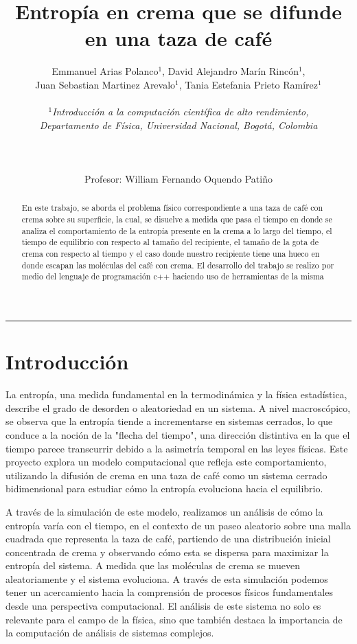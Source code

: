 \documentclass{article}
\title{Entropía en crema que se difunde en una taza de café}
\author{
 {\large Emmanuel Arias Polanco$^1$, David Alejandro Marín Rincón$^1$,} \\
 {\large Juan Sebastian Martinez Arevalo$^1$, Tania Estefania Prieto Ramírez$^1$} \\ \\
 \textit{$^1$Introducción a la computación científica de alto rendimiento,} \\ 
 \textit{Departamento de Física, Universidad Nacional, Bogotá, Colombia} \\ \\
\Today\\ \\
 Profesor: William Fernando Oquendo Patiño\\
}
\begin{document}
\vspace{-5mm}
\maketitle
\begin{abstract}
    En este trabajo, se aborda el problema físico correspondiente a una taza de café con crema sobre su superficie, la cual, se disuelve a medida que pasa el tiempo en donde se analiza el comportamiento de la entropía presente en la crema a lo largo del tiempo, el tiempo de equilibrio con respecto al tamaño del recipiente, el tamaño de la gota de crema con respecto al tiempo y el caso donde nuestro recipiente tiene una hueco en donde escapan las moléculas del café con crema. El desarrollo del trabajo se realizo por medio del lenguaje de programación c++ haciendo uso de herramientas de la misma
\end{abstract}

\rule{\linewidth}{0.5mm}

\section*{Introducción}

    La entropía, una medida fundamental en la termodinámica y la física estadística, describe el grado de desorden o aleatoriedad en un sistema. A nivel macroscópico, se observa que la entropía tiende a incrementarse en sistemas cerrados, lo que conduce a la noción de la "flecha del tiempo", una dirección distintiva en la que el tiempo parece transcurrir debido a la asimetría temporal en las leyes físicas. Este proyecto explora un modelo computacional que refleja este comportamiento, utilizando la difusión de crema en una taza de café como un sistema cerrado bidimensional para estudiar cómo la entropía evoluciona hacia el equilibrio.

    A través de la simulación de este modelo, realizamos un análisis de cómo la entropía varía con el tiempo, en el contexto de un paseo aleatorio sobre una malla cuadrada que representa la taza de café, partiendo de una distribución inicial concentrada de crema y observando cómo esta se dispersa para maximizar la entropía del sistema. A medida que las moléculas de crema se mueven aleatoriamente y el sistema evoluciona. A través de esta simulación podemos tener un acercamiento hacia la comprensión de procesos físicos fundamentales desde una perspectiva computacional. El análisis de este sistema no solo es relevante para el campo de la física, sino que también destaca la importancia de la computación de análisis de sistemas complejos.
\end{document}
